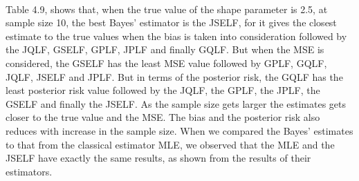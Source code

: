 \documentclass[a4paper,12pt]{report}
\begin{document}
{\begin{minipage}{\linewidth}
		
\end{minipage}
\\\vspace{1cm}

\indent Table 4.9, shows that, when the true value of the shape parameter is 2.5, at sample size 10, the best Bayes’ estimator is the JSELF, for it gives the closest estimate to the true values when the bias is taken into consideration followed by the JQLF, GSELF, GPLF, JPLF and finally GQLF. But when the MSE is considered, the GSELF has the least MSE value followed by GPLF, GQLF, JQLF, JSELF and JPLF. But in terms of the posterior risk, the GQLF has the least posterior risk value followed by the JQLF, the GPLF, the JPLF, the GSELF and finally the JSELF.
As the sample size gets larger the estimates gets closer to the true value and the MSE. The bias and the posterior risk also reduces with increase in the sample size. When we compared the Bayes’ estimates to that from the classical estimator MLE, we observed that the MLE and the JSELF have exactly the same results, as shown from the results of their estimators.\\

}
\end{document}
